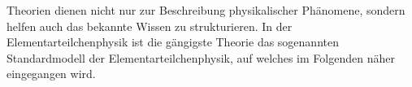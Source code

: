 Theorien dienen nicht nur zur Beschreibung physikalischer Ph\"anomene, sondern helfen auch das bekannte Wissen zu strukturieren.
In der Elementarteilchenphysik ist die g\"angigste Theorie das sogenannten Standardmodell der Elementarteilchenphysik, auf welches im Folgenden n\"aher eingegangen wird.